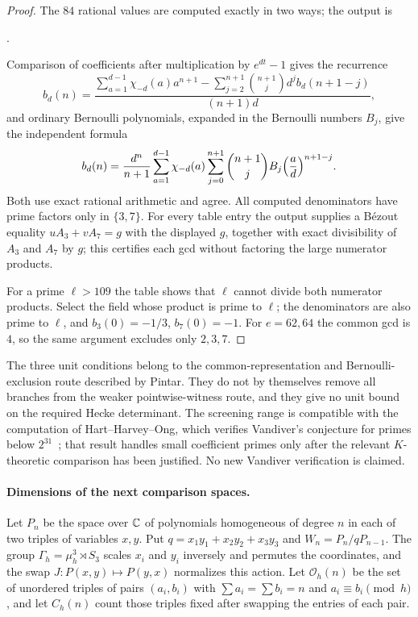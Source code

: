 \begin{proof}
The $84$ rational values are computed exactly in two ways; the output is
\begin{center}
.
\end{center} Comparison of coefficients
after multiplication by $e^{dt}-1$ gives the recurrence
\[
 b_d(n)=\frac{\displaystyle\sum_{a=1}^{d-1}\chi_{-d}(a)a^{n+1}
 -\sum_{j=2}^{n+1}\binom{n+1}{j}d^jb_d(n+1-j)}{(n+1)d},
\]
and ordinary Bernoulli polynomials, expanded in the Bernoulli numbers $B_j$,
give the independent formula
\[
 b_d(n)=\frac{d^n}{n+1}\sum_{a=1}^{d-1}\chi_{-d}(a)
 \sum_{j=0}^{n+1}\binom{n+1}{j}B_j\Bigl(\frac ad\Bigr)^{n+1-j}.
\]
Both use exact rational arithmetic and agree. All computed denominators
have prime factors only in $\{3,7\}$. For every table entry the output
supplies a B\'ezout equality $uA_3+vA_7=g$ with the displayed $g$, together
with exact divisibility of $A_3$ and $A_7$ by $g$; this certifies each gcd
without factoring the large numerator products.

For a prime $\ell>109$ the table shows that $\ell$ cannot divide both
numerator products. Select the field whose product is prime to $\ell$; the
denominators are also prime to $\ell$, and $b_3(0)=-1/3$, $b_7(0)=-1$. For
$e=62,64$ the common gcd is $4$, so the same argument excludes only
$2,3,7$.
\end{proof}

The three unit conditions belong to the common-representation and
Bernoulli-exclusion route described by Pintar. They do not by themselves
remove all branches from the weaker pointwise-witness route, and they give
no unit bound on the required Hecke determinant. The screening range is
compatible with the computation of Hart--Harvey--Ong, which verifies
Vandiver's conjecture for primes below $2^{31}$~\cite{Hart2017Irregular};
that result handles small coefficient primes only after the relevant
$K$-theoretic comparison has been justified. No new Vandiver verification
is claimed.

\paragraph{Dimensions of the next comparison spaces.}
Let $P_n$ be the space over $\mathbb{C}$ of polynomials homogeneous of degree $n$ in
each of two triples of variables $x,y$. Put $q=x_1y_1+x_2y_2+x_3y_3$ and
$W_n=P_n/qP_{n-1}$. The group $\Gamma_h=\mu_h^3\rtimes S_3$ scales $x_i$
and $y_i$ inversely and permutes the coordinates, and the swap
$J\colon P(x,y)\mapsto P(y,x)$ normalizes this action. Let
$\mathcal O_h(n)$ be the set of unordered triples of pairs $(a_i,b_i)$ with
$\sum a_i=\sum b_i=n$ and $a_i\equiv b_i\pmod h$, and let $C_h(n)$ count
those triples fixed after swapping the entries of each pair.

